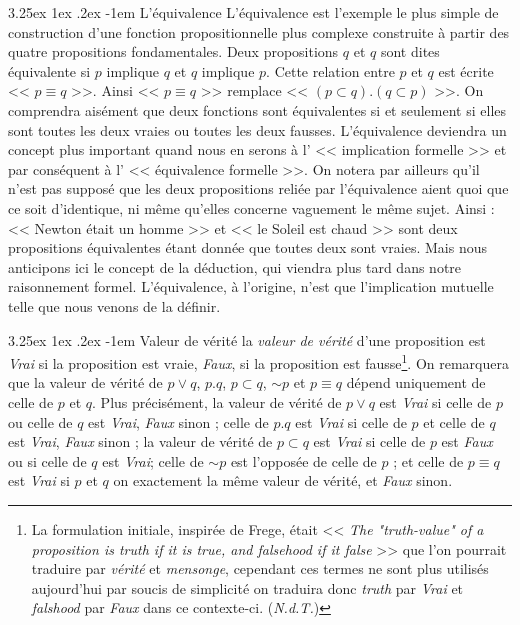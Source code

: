 \documentclass[a4paper]{book}
\makeatletter
\renewcommand\paragraph{\@startsection{paragraph}{5}{\z@}%
  {3.25ex \@plus1ex \@minus.2ex}%
  {-1em}%
  {\normalfont\normalsize\bfseries}}
\makeatother
\begin{document}
\paragraph{L'équivalence} L'équivalence est l'exemple le plus simple de construction d'une fonction propositionnelle plus complexe construite à partir des quatre propositions fondamentales. Deux propositions $q$ et $q$ sont dites équivalente si $p$ implique $q$ et $q$ implique $p$. Cette relation entre $p$ et $q$ est écrite << $p\equiv q$ >>.
 Ainsi << $p\equiv q$ >> remplace << $(p\subset q).(q\subset p)$ >>. On comprendra aisément que deux fonctions sont équivalentes si et seulement si elles sont toutes les deux vraies ou toutes les deux fausses. L'équivalence deviendra un concept plus important quand nous en serons à l' << implication formelle >> et par conséquent à l' << équivalence formelle >>. On notera par ailleurs qu'il n'est pas supposé que les deux propositions reliée par l'équivalence aient quoi que ce soit d'identique, ni même qu'elles concerne vaguement le même sujet. Ainsi : << Newton était un homme >> et << le Soleil est chaud >> sont deux propositions équivalentes étant donnée que toutes deux sont vraies. Mais nous anticipons ici le concept de la déduction, qui viendra plus tard dans notre raisonnement formel. L'équivalence, à l'origine, n'est que l'implication mutuelle telle que nous venons de la définir.

\paragraph{Valeur de vérité} la \textit{valeur de vérité} d'une proposition est \textit{Vrai} si la proposition est vraie, \textit{Faux}, si la proposition est fausse\footnote{La formulation initiale, inspirée de Frege, était << \textit{The "truth-value" of a proposition is \emph{truth} if it is true, and \emph{falsehood} if it false} >> que l'on pourrait traduire par \textit{vérité} et \textit{mensonge}, cependant ces termes ne sont plus utilisés aujourd'hui par soucis de simplicité on traduira donc \textit{truth} par \textit{Vrai} et \textit{falshood} par \textit{Faux} dans ce contexte-ci. (\textit{N.d.T.})}.
On remarquera que la valeur de vérité de $p\lor q$, $p.q$, $p\subset q$, $\sim p$ et $p\equiv q$ dépend uniquement de celle de $p$ et $q$. Plus précisément, la valeur de vérité de $p\lor q$ est \textit{Vrai} si celle de $p$ ou celle de $q$ est \textit{Vrai}, \textit{Faux} sinon ; celle de $p.q$ est \textit{Vrai} si celle de $p$ et celle de $q$ est \textit{Vrai}, \textit{Faux} sinon ; la valeur de vérité de $p\subset q$ est \textit{Vrai} si celle de $p$ est \textit{Faux} ou si celle de $q$ est \textit{Vrai}; celle de $\sim p$ est l'opposée de celle de $p$ ; et celle de $p\equiv q$ est \textit{Vrai} si $p$ et $q$ on exactement la même valeur de vérité, et \textit{Faux} sinon. 
\end{document}
